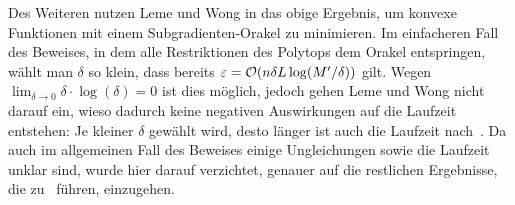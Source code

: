 Des Weiteren nutzen Leme und Wong in \cite[Theorem~6]{PaesLeme2018} das obige Ergebnis, um konvexe Funktionen mit einem Subgradienten-Orakel zu minimieren.
Im einfacheren Fall des Beweises, in dem alle Restriktionen des Polytops dem Orakel entspringen, wählt man $\delta$ so klein, dass bereits $\varepsilon=\mathcal{O}(n\delta L \log(M'/ \delta))$ gilt.
Wegen $\lim_{\delta \rightarrow 0}\delta \cdot \log(\delta)= 0$ ist dies möglich, jedoch gehen Leme und Wong nicht darauf ein, wieso dadurch keine negativen Auswirkungen auf die Laufzeit entstehen: Je kleiner $\delta$ gewählt wird, desto länger ist auch die Laufzeit nach~\cite[Theorem~5]{PaesLeme2018}.
Da auch im allgemeinen Fall des Beweises einige Ungleichungen sowie die Laufzeit unklar sind, wurde hier darauf verzichtet, genauer auf die restlichen Ergebnisse, die zu~\cite[Theorem~7]{PaesLeme2018} führen, einzugehen.

\iffalse
{}



